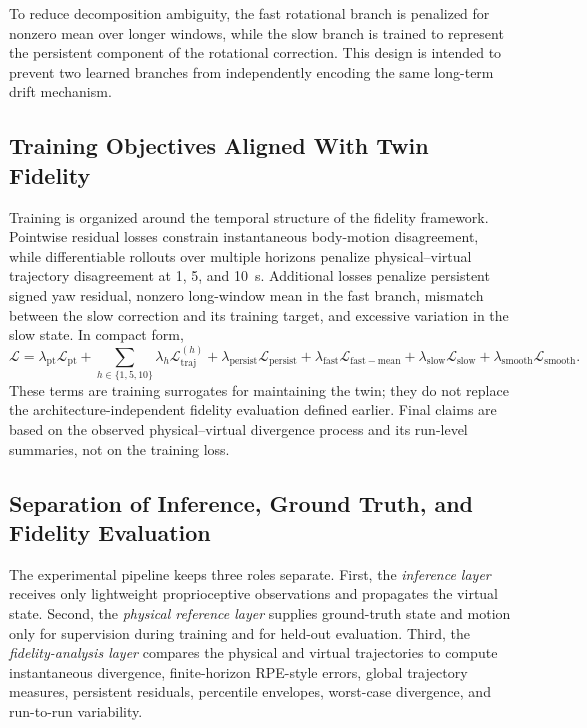 \documentclass[conference]{IEEEtran}
\begin{document}
To reduce decomposition ambiguity, the fast rotational branch is penalized for nonzero mean over longer windows, while the slow branch is trained to represent the persistent component of the rotational correction. This design is intended to prevent two learned branches from independently encoding the same long-term drift mechanism.

\subsection{Training Objectives Aligned With Twin Fidelity}
Training is organized around the temporal structure of the fidelity framework. Pointwise residual losses constrain instantaneous body-motion disagreement, while differentiable rollouts over multiple horizons penalize physical--virtual trajectory disagreement at 1, 5, and 10~s. Additional losses penalize persistent signed yaw residual, nonzero long-window mean in the fast branch, mismatch between the slow correction and its training target, and excessive variation in the slow state. In compact form,
\begin{equation}
\mathcal{L}=
\lambda_{\mathrm{pt}}\mathcal{L}_{\mathrm{pt}}
+\sum_{h\in\{1,5,10\}}\lambda_h\mathcal{L}_{\mathrm{traj}}^{(h)}
+\lambda_{\mathrm{persist}}\mathcal{L}_{\mathrm{persist}}
+\lambda_{\mathrm{fast}}\mathcal{L}_{\mathrm{fast-mean}}
+\lambda_{\mathrm{slow}}\mathcal{L}_{\mathrm{slow}}
+\lambda_{\mathrm{smooth}}\mathcal{L}_{\mathrm{smooth}}.
\end{equation}
These terms are training surrogates for maintaining the twin; they do not replace the architecture-independent fidelity evaluation defined earlier. Final claims are based on the observed physical--virtual divergence process and its run-level summaries, not on the training loss.

\subsection{Separation of Inference, Ground Truth, and Fidelity Evaluation}
The experimental pipeline keeps three roles separate. First, the \emph{inference layer} receives only lightweight proprioceptive observations and propagates the virtual state. Second, the \emph{physical reference layer} supplies ground-truth state and motion only for supervision during training and for held-out evaluation. Third, the \emph{fidelity-analysis layer} compares the physical and virtual trajectories to compute instantaneous divergence, finite-horizon RPE-style errors, global trajectory measures, persistent residuals, percentile envelopes, worst-case divergence, and run-to-run variability.
\end{document}
